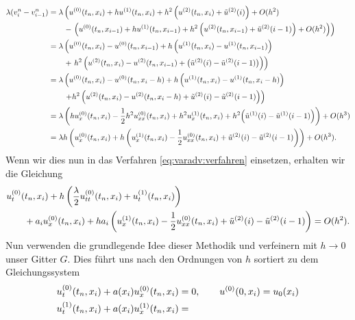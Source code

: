 {\small\begin{align*}
\lambda (v^n_{i} - v^n_{i-1})
&= \lambda \left( u^{(0)}(t_n, x_i) + h u^{(1)}(t_n, x_i) + h^2 \left(u^{(2)}(t_n, x_i) + \tilde u^{(2)}(i) \right) + O(h^2) \right.\\
   &\qquad -  \left. \left( u^{(0)}(t_n, x_{i-1}) + h u^{(1)}(t_n, x_{i-1}) + h^2 \left( u^{(2)}(t_n, x_{i-1}) + \tilde u^{(2)}(i-1)\right)  + O(h^2) \right) \right)\\
&= \lambda \left( u^{(0)}(t_n, x_i) - u^{(0)}(t_n, x_{i-1}) + h \left( u^{(1)}(t_n, x_i) - u^{(1)}(t_n, x_{i-1}) \right) \right.\\
   &\qquad + \left. h^2 \left( u^{(2)}(t_n, x_i) - u^{(2)}(t_n, x_{i-1}) + \bigl( \tilde u^{(2)}(i) - \tilde u^{(2)}(i-1) \bigr) \right) \right)\\
&= \lambda \left( u^{(0)}(t_n, x_i) - u^{(0)}(t_n, x_i-h) + h \left( u^{(1)}(t_n, x_i) - u^{(1)}(t_n, x_i-h) \right) \right. \\
   &\qquad \left. + h^2 \left( u^{(2)}(t_n, x_i) - u^{(2)}(t_n, x_i-h) + \tilde u^{(2)}(i) - \tilde u^{(2)}(i-1) \right) \right)\\
&= \lambda \left( h u^{(0)}_x(t_n, x_i) - \frac 12 h^2 u^{(0)}_{xx}(t_n, x_i) + h^2 u^{(1)}_x(t_n, x_i) + h^2\Bigl( \tilde u^{(1)}(i) - \tilde u^{(1)}(i-1) \Bigr) \right) + O(h^3) \\
&= \lambda h \left( u^{(0)}_x(t_n, x_i) + h \left( u^{(1)}_x(t_n, x_i) - \frac 12 u^{(0)}_{xx}(t_n, x_i) + \tilde u^{(2)}(i) - \tilde u^{(2)}(i-1) \right) \right) + O(h^3).
\end{align*}}
Wenn wir dies nun in das Verfahren \eqref{eq:varadv:verfahren} einsetzen, erhalten wir die Gleichung
\begin{align*}
&u^{(0)}_t (t_n, x_i) + h \left( \frac \lambda 2 u^{(0)}_{tt}(t_n, x_i) + u^{(1)}_t(t_n, x_i) \right)\\ 
&\qquad +  a_i u^{(0)}_x(t_n, x_i) + h a_i \left( u^{(1)}_x(t_n, x_i) - \frac 12 u^{(0)}_{xx}(t_n, x_i) + \tilde u^{(2)}(i) - \tilde u^{(2)}(i-1) \right) = O(h^2).
\end{align*}
Nun verwenden die grundlegende Idee dieser Methodik und verfeinern mit $h \to 0$ unser Gitter $G$.
Dies führt uns nach den Ordnungen von $h$ sortiert zu dem Gleichungssystem
\begin{align}
u^{(0)}_t(t_n, x_i) + a(x_i) u^{(0)}_x(t_n, x_i) &= 0, \qquad u^{(0)}(0, x_i) = u_0(x_i)\\
u^{(1)}_t(t_n, x_i) + a(x_i) u^{(1)}_x(t_n, x_i) &= 
\end{align}